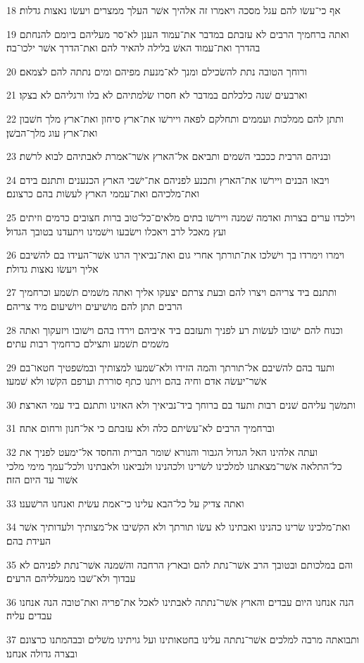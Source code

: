 \par 18 אף כי־עשׂו להם עגל מסכה ויאמרו זה אלהיך אשׁר העלך ממצרים ויעשׂו נאצות גדלות׃
\par 19 ואתה ברחמיך הרבים לא עזבתם במדבר את־עמוד הענן לא־סר מעליהם ביומם להנחתם בהדרך ואת־עמוד האשׁ בלילה להאיר להם ואת־הדרך אשׁר ילכו־בה׃
\par 20 ורוחך הטובה נתת להשׂכילם ומנך לא־מנעת מפיהם ומים נתתה להם לצמאם׃
\par 21 וארבעים שׁנה כלכלתם במדבר לא חסרו שׂלמתיהם לא בלו ורגליהם לא בצקו׃
\par 22 ותתן להם ממלכות ועממים ותחלקם לפאה ויירשׁו את־ארץ סיחון ואת־ארץ מלך חשׁבון ואת־ארץ עוג מלך־הבשׁן׃
\par 23 ובניהם הרבית כככבי השׁמים ותביאם אל־הארץ אשׁר־אמרת לאבתיהם לבוא לרשׁת׃
\par 24 ויבאו הבנים ויירשׁו את־הארץ ותכנע לפניהם את־ישׁבי הארץ הכנענים ותתנם בידם ואת־מלכיהם ואת־עממי הארץ לעשׂות בהם כרצונם׃
\par 25 וילכדו ערים בצרות ואדמה שׁמנה ויירשׁו בתים מלאים־כל־טוב ברות חצובים כרמים וזיתים ועץ מאכל לרב ויאכלו וישׂבעו וישׁמינו ויתעדנו בטובך הגדול׃
\par 26 וימרו וימרדו בך וישׁלכו את־תורתך אחרי גום ואת־נביאיך הרגו אשׁר־העידו בם להשׁיבם אליך ויעשׂו נאצות גדולת׃
\par 27 ותתנם ביד צריהם ויצרו להם ובעת צרתם יצעקו אליך ואתה משׁמים תשׁמע וכרחמיך הרבים תתן להם מושׁיעים ויושׁיעום מיד צריהם׃
\par 28 וכנוח להם ישׁובו לעשׂות רע לפניך ותעזבם ביד איביהם וירדו בהם וישׁובו ויזעקוך ואתה משׁמים תשׁמע ותצילם כרחמיך רבות עתים׃
\par 29 ותעד בהם להשׁיבם אל־תורתך והמה הזידו ולא־שׁמעו למצותיך ובמשׁפטיך חטאו־בם אשׁר־יעשׂה אדם וחיה בהם ויתנו כתף סוררת וערפם הקשׁו ולא שׁמעו׃
\par 30 ותמשׁך עליהם שׁנים רבות ותעד בם ברוחך ביד־נביאיך ולא האזינו ותתנם ביד עמי הארצת׃
\par 31 וברחמיך הרבים לא־עשׂיתם כלה ולא עזבתם כי אל־חנון ורחום אתה׃
\par 32 ועתה אלהינו האל הגדול הגבור והנורא שׁומר הברית והחסד אל־ימעט לפניך את כל־התלאה אשׁר־מצאתנו למלכינו לשׂרינו ולכהנינו ולנביאנו ולאבתינו ולכל־עמך מימי מלכי אשׁור עד היום הזה׃
\par 33 ואתה צדיק על כל־הבא עלינו כי־אמת עשׂית ואנחנו הרשׁענו׃
\par 34 ואת־מלכינו שׂרינו כהנינו ואבתינו לא עשׂו תורתך ולא הקשׁיבו אל־מצותיך ולעדותיך אשׁר העידת בהם׃
\par 35 והם במלכותם ובטובך הרב אשׁר־נתת להם ובארץ הרחבה והשׁמנה אשׁר־נתת לפניהם לא עבדוך ולא־שׁבו ממעלליהם הרעים׃
\par 36 הנה אנחנו היום עבדים והארץ אשׁר־נתתה לאבתינו לאכל את־פריה ואת־טובה הנה אנחנו עבדים עליה׃
\par 37 ותבואתה מרבה למלכים אשׁר־נתתה עלינו בחטאותינו ועל גויתינו משׁלים ובבהמתנו כרצונם ובצרה גדולה אנחנו׃

